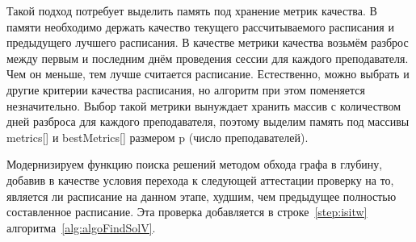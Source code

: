 Такой подход потребует выделить память под хранение метрик качества. В памяти необходимо держать качество текущего рассчитываемого расписания и предыдущего лучшего расписания.
В качестве метрики качества возьмём разброс между первым и последним днём проведения сессии для каждого преподавателя. Чем он меньше, тем лучше считается расписание. Естественно, можно выбрать и другие критерии качества расписания, но алгоритм при этом поменяется незначительно.
Выбор такой метрики вынуждает хранить массив с количеством дней разброса для каждого преподавателя, поэтому выделим память под массивы metrics[] и bestMetrics[] размером p (число преподавателей).

Модернизируем функцию поиска решений методом обхода графа в глубину, 
добавив в качестве условия перехода к следующей аттестации проверку на то, является ли расписание на данном этапе, худшим, чем предыдущее полностью составленное расписание. Эта проверка добавляется в строке~\ref{step:isitw} алгоритма~\ref{alg:algoFindSolV}.

